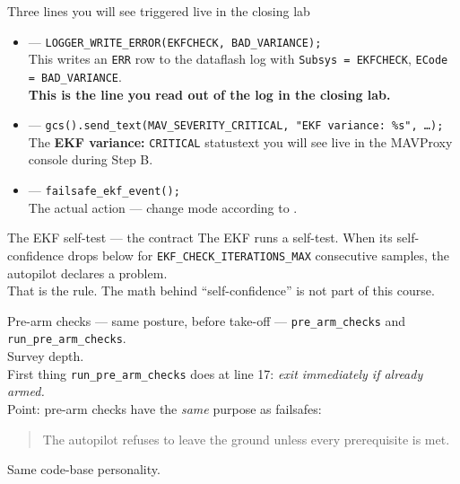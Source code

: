 \documentclass[aspectratio=169,11pt]{beamer}
\begin{document}
\begin{frame}{Three lines you will see triggered live in the closing lab}
  \begin{itemize}
    \item {} --- \texttt{LOGGER\_WRITE\_ERROR(EKFCHECK, BAD\_VARIANCE);}\\
      This writes an \texttt{ERR} row to the dataflash log with \texttt{Subsys = EKFCHECK}, \texttt{ECode = BAD\_VARIANCE}.\\
      \textbf{This is the line you read out of the log in the closing lab.}
    \item {} --- \texttt{gcs().send\_text(MAV\_SEVERITY\_CRITICAL, "EKF variance: \%s", \dots);}\\
      The \textbf{EKF variance:} \texttt{CRITICAL} statustext you will see live in the MAVProxy console during Step B.
    \item {} --- \texttt{failsafe\_ekf\_event();}\\
      The actual action --- change mode according to .
  \end{itemize}
\end{frame}

\begin{frame}{The EKF self-test --- the contract}
  The EKF runs a self-test. When its self-confidence drops below  for \texttt{EKF\_CHECK\_ITERATIONS\_MAX} consecutive samples, the autopilot declares a problem.\\[1ex]
  That is the rule. The math behind ``self-confidence'' is not part of this course.
\end{frame}

\begin{frame}{Pre-arm checks --- same posture, before take-off}
   --- \texttt{pre\_arm\_checks} and \texttt{run\_pre\_arm\_checks}.\\[1ex]
  Survey depth.\\[1ex]
  First thing \texttt{run\_pre\_arm\_checks} does at line 17: \emph{exit immediately if already armed.}\\[1ex]
  Point: pre-arm checks have the \emph{same} purpose as failsafes:
  \begin{quote}
    The autopilot refuses to leave the ground unless every prerequisite is met.
  \end{quote}
  Same code-base personality.
\end{frame}
\end{document}

